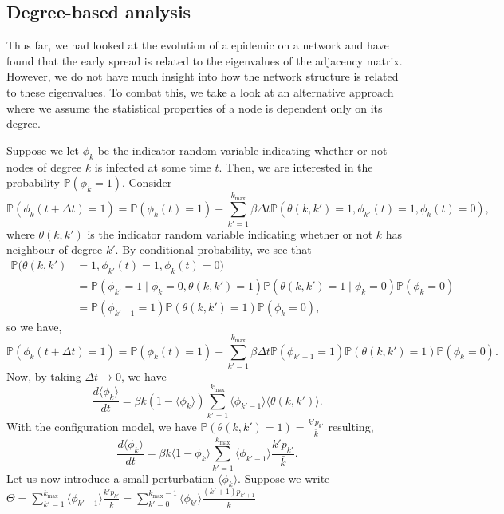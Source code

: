 \documentclass[
]{article}
\theoremstyle{definition}
\theoremstyle{definition}
\begin{document}
\hypertarget{degree-based-analysis}{%
\subsection{Degree-based analysis}\label{degree-based-analysis}}

Thus far, we had looked at the evolution of a epidemic on a network and
have found that the early spread is related to the eigenvalues of the
adjacency matrix. However, we do not have much insight into how the
network structure is related to these eigenvalues. To combat this, we
take a look at an alternative approach where we assume the statistical
properties of a node is dependent only on its degree.

Suppose we let \(\phi_k\) be the indicator random variable indicating
whether or not nodes of degree \(k\) is infected at some time \(t\).
Then, we are interested in the probability \(\mathbb{P}(\phi_k = 1)\).
Consider
\[\mathbb{P}(\phi_k(t + \Delta t) = 1) = \mathbb{P}(\phi_k(t) = 1) + 
  \sum_{k' = 1}^{k_{\max}} \beta \Delta t 
  \mathbb{P}(\theta(k, k') = 1, \phi_{k'}(t) = 1, \phi_k(t) = 0),\]
where \(\theta(k, k')\) is the indicator random variable indicating
whether or not \(k\) has neighbour of degree \(k'\). By conditional
probability, we see that \begin{align*}
  \mathbb{P}(\theta(k, k') & = 1, \phi_{k'}(t) = 1, \phi_k(t) = 0) \\
  & = \mathbb{P}(\phi_{k'} = 1 \mid \phi_k = 0, \theta(k, k') = 1)
    \mathbb{P}(\theta(k, k') = 1 \mid \phi_k = 0) \mathbb{P}(\phi_k = 0) \\
  & = \mathbb{P}(\phi_{k' - 1} = 1) \mathbb{P}(\theta(k, k') = 1) 
    \mathbb{P}(\phi_k = 0),
\end{align*} so we have,
\[\mathbb{P}(\phi_k(t + \Delta t) = 1) = \mathbb{P}(\phi_k(t) = 1) + 
  \sum_{k' = 1}^{k_{\max}} \beta \Delta t 
  \mathbb{P}(\phi_{k' - 1} = 1) \mathbb{P}(\theta(k, k') = 1) \mathbb{P}(\phi_k = 0).\]
Now, by taking \(\Delta t \to 0\), we have
\[\frac{d \langle \phi_k \rangle}{dt} = \beta k (1 - \langle \phi_k \rangle) 
  \sum_{k' = 1}^{k_{\max}} \langle \phi_{k' - 1} \rangle \langle \theta(k, k') \rangle.\]
With the configuration model, we have
\(\mathbb{P}(\theta(k, k') = 1) = \frac{k' p_{k'}}{\bar{k}}\) resulting,
\[\frac{d \langle \phi_k \rangle}{dt} = \beta k \langle 1 - \phi_k \rangle
  \sum_{k' = 1}^{k_{\max}} \langle \phi_{k' - 1} \rangle \frac{k' p_{k'}}{\bar{k}}.\]
Let us now introduce a small perturbation \(\langle \phi_k \rangle\).
Suppose we write
\(\Theta = \sum_{k' = 1}^{k_{\max}} \langle \phi_{k' - 1} \rangle \frac{k' p_{k'}}{\bar{k}} = \sum_{k' = 0}^{k_{\max} - 1} \langle \phi_{k'} \rangle \frac{(k' + 1) p_{k' + 1}}{\bar{k}}\)
\end{document}
